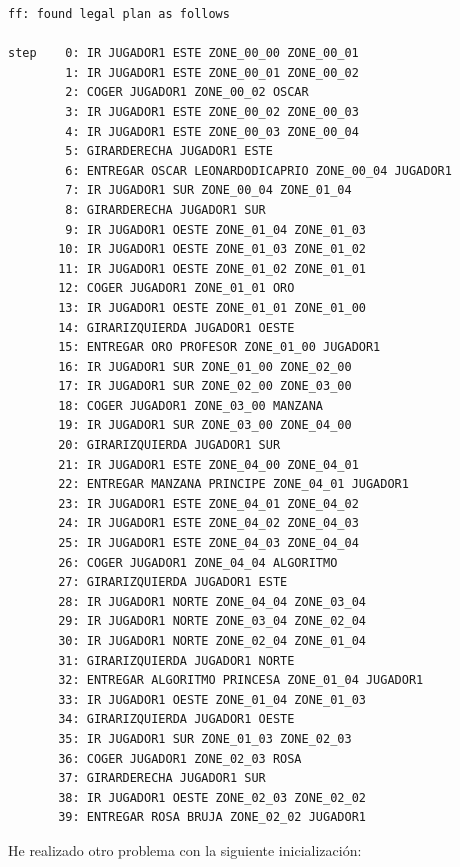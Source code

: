 \documentclass[12pt]{article}
\begin{document}
\begin{verbatim}
ff: found legal plan as follows

step    0: IR JUGADOR1 ESTE ZONE_00_00 ZONE_00_01
        1: IR JUGADOR1 ESTE ZONE_00_01 ZONE_00_02
        2: COGER JUGADOR1 ZONE_00_02 OSCAR
        3: IR JUGADOR1 ESTE ZONE_00_02 ZONE_00_03
        4: IR JUGADOR1 ESTE ZONE_00_03 ZONE_00_04
        5: GIRARDERECHA JUGADOR1 ESTE
        6: ENTREGAR OSCAR LEONARDODICAPRIO ZONE_00_04 JUGADOR1
        7: IR JUGADOR1 SUR ZONE_00_04 ZONE_01_04
        8: GIRARDERECHA JUGADOR1 SUR
        9: IR JUGADOR1 OESTE ZONE_01_04 ZONE_01_03
       10: IR JUGADOR1 OESTE ZONE_01_03 ZONE_01_02
       11: IR JUGADOR1 OESTE ZONE_01_02 ZONE_01_01
       12: COGER JUGADOR1 ZONE_01_01 ORO
       13: IR JUGADOR1 OESTE ZONE_01_01 ZONE_01_00
       14: GIRARIZQUIERDA JUGADOR1 OESTE
       15: ENTREGAR ORO PROFESOR ZONE_01_00 JUGADOR1
       16: IR JUGADOR1 SUR ZONE_01_00 ZONE_02_00
       17: IR JUGADOR1 SUR ZONE_02_00 ZONE_03_00
       18: COGER JUGADOR1 ZONE_03_00 MANZANA
       19: IR JUGADOR1 SUR ZONE_03_00 ZONE_04_00
       20: GIRARIZQUIERDA JUGADOR1 SUR
       21: IR JUGADOR1 ESTE ZONE_04_00 ZONE_04_01
       22: ENTREGAR MANZANA PRINCIPE ZONE_04_01 JUGADOR1
       23: IR JUGADOR1 ESTE ZONE_04_01 ZONE_04_02
       24: IR JUGADOR1 ESTE ZONE_04_02 ZONE_04_03
       25: IR JUGADOR1 ESTE ZONE_04_03 ZONE_04_04
       26: COGER JUGADOR1 ZONE_04_04 ALGORITMO
       27: GIRARIZQUIERDA JUGADOR1 ESTE
       28: IR JUGADOR1 NORTE ZONE_04_04 ZONE_03_04
       29: IR JUGADOR1 NORTE ZONE_03_04 ZONE_02_04
       30: IR JUGADOR1 NORTE ZONE_02_04 ZONE_01_04
       31: GIRARIZQUIERDA JUGADOR1 NORTE
       32: ENTREGAR ALGORITMO PRINCESA ZONE_01_04 JUGADOR1
       33: IR JUGADOR1 OESTE ZONE_01_04 ZONE_01_03
       34: GIRARIZQUIERDA JUGADOR1 OESTE
       35: IR JUGADOR1 SUR ZONE_01_03 ZONE_02_03
       36: COGER JUGADOR1 ZONE_02_03 ROSA
       37: GIRARDERECHA JUGADOR1 SUR
       38: IR JUGADOR1 OESTE ZONE_02_03 ZONE_02_02
       39: ENTREGAR ROSA BRUJA ZONE_02_02 JUGADOR1

\end{verbatim}

He realizado otro problema con la siguiente inicialización: 
\end{document}
